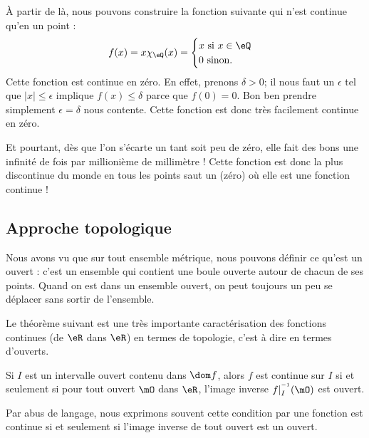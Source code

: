 À partir de là, nous pouvons construire la fonction suivante qui n'est continue qu'en un point :
\[ 
  f(x)=x\chi_{\eQ}(x)=
\begin{cases}
x\text{ si $x\in\eQ$}\\
0\text{ sinon.}
\end{cases}
\]
Cette fonction est continue en zéro. En effet, prenons $\delta>0$; il nous faut un $\epsilon$ tel que $| x |\leq\epsilon$ implique $f(x)\leq \delta$ parce que $f(0)=0$. Bon ben prendre simplement $\epsilon=\delta$ nous contente. Cette fonction est donc très facilement continue en zéro.

Et pourtant, dès que l'on s'écarte un tant soit peu de zéro, elle fait des bons une infinité de fois par millionième de millimètre ! Cette fonction est donc la plus discontinue du monde en tous les points saut un (zéro) où elle est une fonction continue !

\subsection{Approche topologique}

Nous avons vu que sur tout ensemble métrique, nous pouvons définir ce qu'est un ouvert : c'est un ensemble qui contient une boule ouverte autour de chacun de ses points. Quand on est dans un ensemble ouvert, on peut toujours un peu se déplacer sans sortir de l'ensemble.

Le théorème suivant est une très importante caractérisation des fonctions continues (de $\eR$ dans $\eR$) en termes de topologie, c'est à dire en termes d'ouverts.

\begin{theorem}     \label{ThoContInvOuvert}
Si $I$ est un intervalle ouvert contenu dans $\dom f$, alors $f$ est continue sur $I$ si et seulement si pour tout ouvert $\mO$ dans $\eR$, l'image inverse $f|_I^{^{-1}}(\mO)$ est ouvert.
\end{theorem}

Par abus de langage, nous exprimons souvent cette condition par \og une fonction est continue si et seulement si l'image inverse de tout ouvert est un ouvert\fg.

